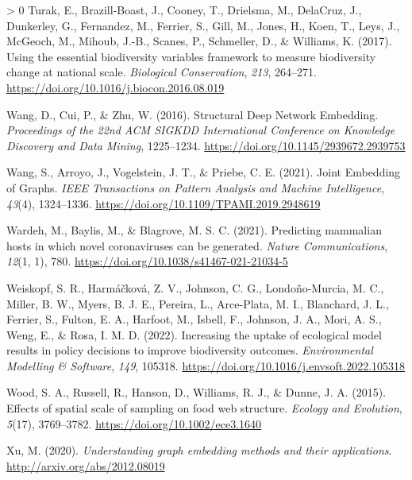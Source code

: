 \documentclass[10pt,oneside]{article}
\newlength{\cslhangindent}
\newenvironment{CSLReferences}[3] %
 {%
  \setlength{\parindent}{0pt}
  \ifodd #1 \everypar{\setlength{\hangindent}{\cslhangindent}}\ignorespaces\fi
  \ifnum #2 > 0
  \setlength{\parskip}{#2\baselineskip}
  \fi
 }%
 {}
\begin{document}
\begin{CSLReferences}{1}{0}
\leavevmode\hypertarget{ref-Turak2017UsiEss}{}%
Turak, E., Brazill-Boast, J., Cooney, T., Drielsma, M., DelaCruz, J.,
Dunkerley, G., Fernandez, M., Ferrier, S., Gill, M., Jones, H., Koen,
T., Leys, J., McGeoch, M., Mihoub, J.-B., Scanes, P., Schmeller, D., \&
Williams, K. (2017). Using the essential biodiversity variables
framework to measure biodiversity change at national scale.
\emph{Biological Conservation}, \emph{213}, 264--271.
\url{https://doi.org/10.1016/j.biocon.2016.08.019}

\leavevmode\hypertarget{ref-Wang2016StrDee}{}%
Wang, D., Cui, P., \& Zhu, W. (2016). Structural Deep Network Embedding.
\emph{Proceedings of the 22nd ACM SIGKDD International Conference on
Knowledge Discovery and Data Mining}, 1225--1234.
\url{https://doi.org/10.1145/2939672.2939753}

\leavevmode\hypertarget{ref-Wang2021JoiEmb}{}%
Wang, S., Arroyo, J., Vogelstein, J. T., \& Priebe, C. E. (2021). Joint
Embedding of Graphs. \emph{IEEE Transactions on Pattern Analysis and
Machine Intelligence}, \emph{43}(4), 1324--1336.
\url{https://doi.org/10.1109/TPAMI.2019.2948619}

\leavevmode\hypertarget{ref-Wardeh2021PreMam}{}%
Wardeh, M., Baylis, M., \& Blagrove, M. S. C. (2021). Predicting
mammalian hosts in which novel coronaviruses can be generated.
\emph{Nature Communications}, \emph{12}(1, 1), 780.
\url{https://doi.org/10.1038/s41467-021-21034-5}

\leavevmode\hypertarget{ref-Weiskopf2022IncUpt}{}%
Weiskopf, S. R., Harmáčková, Z. V., Johnson, C. G., Londoño-Murcia, M.
C., Miller, B. W., Myers, B. J. E., Pereira, L., Arce-Plata, M. I.,
Blanchard, J. L., Ferrier, S., Fulton, E. A., Harfoot, M., Isbell, F.,
Johnson, J. A., Mori, A. S., Weng, E., \& Rosa, I. M. D. (2022).
Increasing the uptake of ecological model results in policy decisions to
improve biodiversity outcomes. \emph{Environmental Modelling \&
Software}, \emph{149}, 105318.
\url{https://doi.org/10.1016/j.envsoft.2022.105318}

\leavevmode\hypertarget{ref-Wood2015EffSpa}{}%
Wood, S. A., Russell, R., Hanson, D., Williams, R. J., \& Dunne, J. A.
(2015). Effects of spatial scale of sampling on food web structure.
\emph{Ecology and Evolution}, \emph{5}(17), 3769--3782.
\url{https://doi.org/10.1002/ece3.1640}

\leavevmode\hypertarget{ref-Xu2020UndGra}{}%
Xu, M. (2020). \emph{Understanding graph embedding methods and their
applications}. \url{http://arxiv.org/abs/2012.08019}


\end{CSLReferences}
\end{document}
